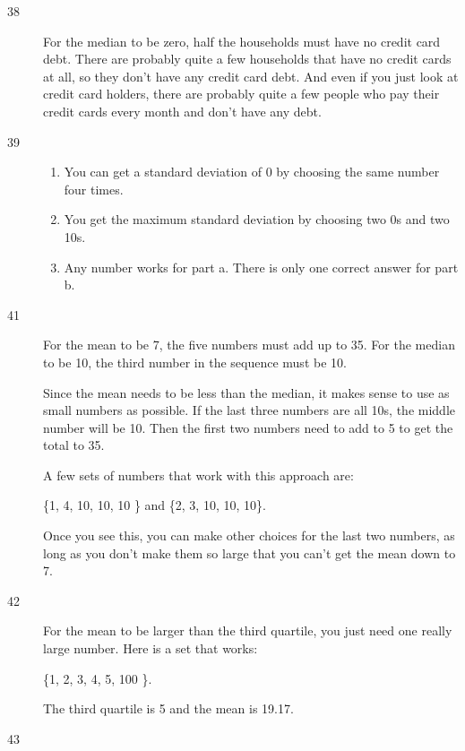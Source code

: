 \documentclass[letterpaper, landscape]{exam}
\begin{document}
\begin{description}
      \item[38]
        For the median to be zero, half the households must have no credit card
        debt.  There are probably quite a few households that have no credit
        cards at all, so they don't have any credit card debt.  And even if you
        just look at credit card holders, there are probably quite a few people
        who pay their credit cards every month and don't have any debt.

      \item[39]
        \begin{enumerate}
          \item You can get a standard deviation of 0 by choosing the same number four times.

          \item You get the maximum standard deviation by choosing two 0s and two 10s.

          \item Any number works for part a.  There is only one correct answer for part b.
        \end{enumerate}

      \item[41]
        For the mean to be 7, the five numbers must add up to 35.  For the
        median to be 10, the third number in the sequence must be 10.

        Since the mean needs to be less than the median, it makes sense to use
        as small numbers as possible.  If the last three numbers are all 10s,
        the middle number will be 10.  Then the first two numbers need to add
        to 5 to get the total to 35.

        A few sets of numbers that work with this approach are: 
        
        \{1, 4, 10, 10, 10 \} and \{2, 3, 10, 10, 10\}.

        Once you see this, you can make other choices for the last two numbers,
        as long as you don't make them so large that you can't get the mean
        down to 7.  

      \item[42]
        For the mean to be larger than the third quartile, you just need one
        really large number.  Here is a set that works: 
        
        \{1, 2, 3, 4, 5, 100 \}.  
        
        The third quartile is 5 and the mean is 19.17.

      \item[43]


\end{description}
\end{document}
